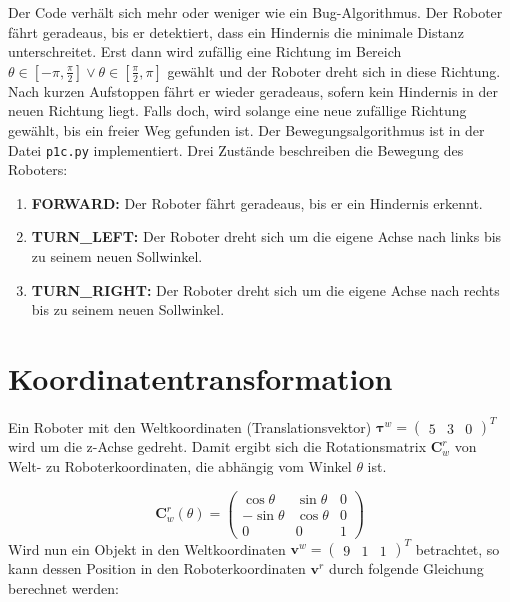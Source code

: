 \documentclass[12pt,a4paper]{report}
\begin{document}
Der Code verhält sich mehr oder weniger wie ein Bug-Algorithmus. Der Roboter fährt geradeaus, bis er detektiert, dass ein Hindernis die minimale Distanz unterschreitet.
Erst dann wird zufällig eine Richtung im Bereich \(\theta \in [-\pi, \frac{\pi}{2}] \lor \theta \in [\frac{\pi}{2}, \pi]\) gewählt und der Roboter dreht sich in diese Richtung.
Nach kurzen Aufstoppen fährt er wieder geradeaus, sofern kein Hindernis in der neuen Richtung liegt.
Falls doch, wird solange eine neue zufällige Richtung gewählt, bis ein freier Weg gefunden ist.
Der Bewegungsalgorithmus ist in der Datei \texttt{p1c.py} implementiert. Drei Zustände beschreiben die Bewegung des Roboters:

\begin{enumerate}
    \item \textbf{FORWARD:} Der Roboter fährt geradeaus, bis er ein Hindernis erkennt.
    \item \textbf{TURN\_LEFT:} Der Roboter dreht sich um die eigene Achse nach links bis zu seinem neuen Sollwinkel.
    \item \textbf{TURN\_RIGHT:} Der Roboter dreht sich um die eigene Achse nach rechts bis zu seinem neuen Sollwinkel.
\end{enumerate}

\chapter{Koordinatentransformation}
Ein Roboter mit den Weltkoordinaten (Translationsvektor) \(\boldsymbol{\tau}^w = \begin{pmatrix} 5 & 3 & 0 \end{pmatrix}^{T}\)
wird um die z-Achse gedreht. Damit ergibt sich die Rotationsmatrix \(\mathbf{C}^r_w\) von Welt- zu Roboterkoordinaten, die
abhängig vom Winkel \(\theta\) ist.


\[
    \mathbf{C}^r_w(\theta) =
    \begin{pmatrix}
        \cos\theta  & \sin\theta & 0 \\
        -\sin\theta & \cos\theta & 0 \\
        0           & 0          & 1
    \end{pmatrix}
\]
Wird nun ein Objekt in den Weltkoordinaten \(\mathbf{v}^w = \begin{pmatrix} 9 & 1 & 1 \end{pmatrix}^{T}\) betrachtet,
so kann dessen Position in den Roboterkoordinaten \(\mathbf{v}^r\) durch folgende Gleichung berechnet werden:
\end{document}

